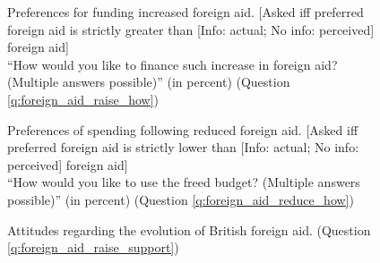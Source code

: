 \documentclass[12pt,english]{article}
\begin{document}
\begin{figure}[h!]
    \caption[Preferences for funding increased foreign aid]{Preferences for funding increased foreign aid. [Asked iff preferred foreign aid is strictly greater than [Info: actual; No info: perceived] foreign aid] \\ ``How would you like to finance such increase in foreign aid? (Multiple answers possible)'' (in percent) (Question \ref{q:foreign_aid_raise_how})}\label{fig:foreign_aid_raise_how}
\end{figure}

\begin{figure}[h!]
    \caption[Preferences of spending following reduced foreign aid]{Preferences of spending following reduced foreign aid. [Asked iff preferred foreign aid is strictly lower than [Info: actual; No info: perceived] foreign aid] \\ ``How would you like to use the freed budget? (Multiple answers possible)'' (in percent) (Question \ref{q:foreign_aid_reduce_how})}\label{fig:foreign_aid_reduce_how}
\end{figure}

\begin{figure}[h!]
    \caption[Attitudes on the evolution of foreign aid]{Attitudes regarding the evolution of British foreign aid. (Question \ref{q:foreign_aid_raise_support})}\label{fig:foreign_aid_raise_support}
\end{figure}
\end{document}
